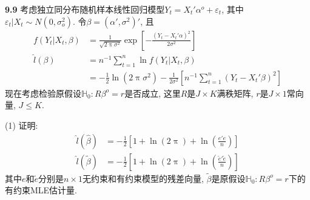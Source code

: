 \documentclass[cn,12pt,math=mtpro2,citestyle=gb7714-2015,bibstyle=gb7714-2015,twocol,mode=simple]{elegantbook}
\newcommand{\HH}{\mathbb{H}}
\newcommand{\hbeta}{\hat{\beta}}
\newcommand{\tbeta}{\tilde{\beta}}
\begin{document}
\textbf{9.9} 考虑独立同分布随机样本线性回归模型$Y_t=X_t'\alpha^o+\varepsilon_t$, 其中$\varepsilon_t|X_t\sim N(0,\sigma^2_o)$. 令$\beta=(\alpha',\sigma^2)'$, 且
\begin{align*}
f(Y_t|X_t,\beta)&=\frac{1}{\sqrt{2\uppi\sigma^2}}\exp\left[-\frac{(Y_t-X_t'\alpha)^2}{2\sigma^2}\right] \\
\hat{l}(\beta)&=n^{-1}\sum_{t=1}^{n}\ln f(Y_t|X_t,\beta) \\
&=-\frac{1}{2}\ln(2\uppi\sigma^2)-\frac{1}{2\sigma^2}\left[n^{-1}\sum_{t=1}^{n}(Y_t-X_t'\beta)^2\right]
\end{align*}
现在考虑检验原假设$\HH_0: R\beta^o=r$是否成立, 这里$R$是$J\times K$满秩矩阵, $r$是$J\times1$常向量, $J\leq K$.

(1) 证明:
\begin{align*}
  \hat{l}(\hbeta)& =-\frac{1}{2}\left[1+\ln(2\uppi)+\ln\left(\frac{e'e}{n}\right)\right] \\
  \hat{l}(\tbeta)& =-\frac{1}{2}\left[1+\ln(2\uppi)+\ln\left(\frac{\tilde{e}'\tilde{e}}{n}\right)\right]
\end{align*}
其中$e$和$\tilde{e}$分别是$n\times1$无约束和有约束模型的残差向量, $\tilde{\beta}$是原假设$\HH_0:R\beta^o=r$下的有约束MLE估计量.
\end{document}
